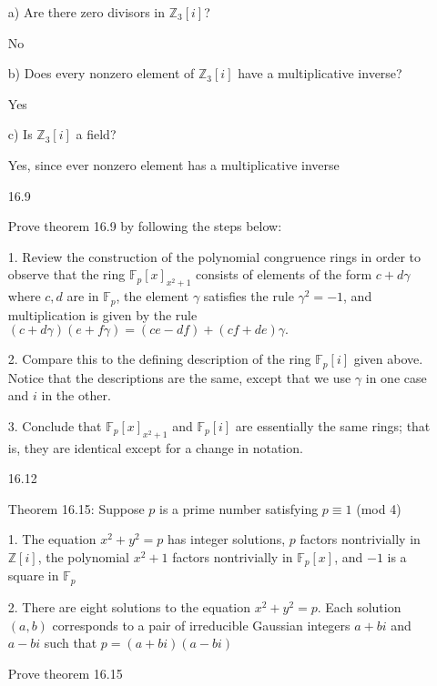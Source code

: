 \documentclass[12pt]{article}
\begin{document}
\begin{itemize}
a) Are there zero divisors in $\mathbb{Z}_3[i]$?

No

b) Does every nonzero element of $\mathbb{Z}_3[i]$ have a multiplicative inverse?

Yes

c) Is $\mathbb{Z}_3[i]$ a field?

Yes, since ever nonzero element has a multiplicative inverse

\newpage
\item[16.9]

Prove theorem 16.9 by following the steps below:

1. Review the construction of the polynomial congruence rings in order to observe that the ring $\mathbb{F}_p[x]_{x^2 + 1}$ consists of elements of the form $c+d\gamma$ where $c, d$ are in $\mathbb{F}_p$, the element $\gamma$ satisfies the rule $\gamma^2 = -1$, and multiplication is given by the rule $(c + d\gamma)(e + f\gamma) = (ce - df) + (cf + de)\gamma.$

2. Compare this to the defining description of the ring $\mathbb{F}_p[i]$ given above. Notice that the descriptions are the same, except that we use $\gamma$ in one case and $i$ in the other.

3. Conclude that $\mathbb{F}_p[x]_{x^2+1}$ and $\mathbb{F}_p[i]$ are essentially the same rings; that is, they are identical except for a change in notation.

\newpage
\item[16.12]

	Theorem 16.15: Suppose $p$ is a prime number satisfying $p \equiv 1$ (mod 4)

	1. The equation $x^2 + y^2 = p$ has integer solutions, $p$ factors nontrivially in $\mathbb{Z}[i]$, the polynomial $x^2 + 1$ factors nontrivially in $\mathbb{F}_p[x]$, and $-1$ is a square in $\mathbb{F}_p$

	2. There are eight solutions to the equation $x^2 + y^2 = p$. Each solution $(a,b)$ corresponds to a pair of irreducible Gaussian integers $a + bi$ and $a-bi$ such that $p = (a+bi)(a-bi)$

Prove theorem 16.15


\end{itemize}
\end{document}
